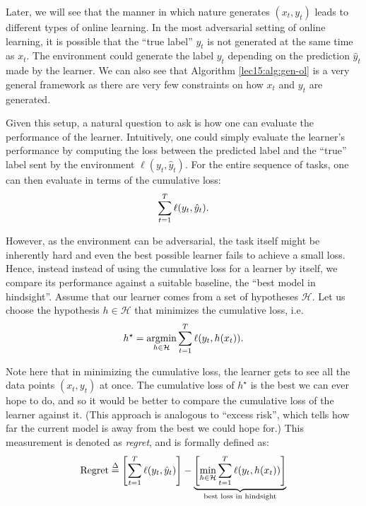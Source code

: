 Later, we will see that the manner in which nature generates  $(x_t, y_t)$ leads to different types of online learning. In the most adversarial setting of online learning, it is possible that the ``true label'' $y_t$ is not generated at the same time as $x_t$. The environment could generate the label $y_t$ depending on the prediction $\hat{y}_t$ made by the learner.  We can also see that Algorithm \ref{lec15:alg:gen-ol} is a very general framework as there are very few constraints on how $x_t$ and $y_t$ are generated.
    
Given this setup, a natural question to ask is how one can evaluate the performance of the learner. Intuitively, one could simply evaluate the learner's performance by computing the loss between the predicted label and the ``true'' label sent by the environment $\ell(y_t, \hat{y}_t)$. For the entire sequence of tasks, one can then evaluate in terms of the cumulative loss:
    \begin{align}
        \sum_{t=1}^T \ell(y_t, \hat{y}_t).
    \end{align}
    
However, as the environment can be adversarial, the task itself might be inherently hard and even the best possible learner fails to achieve a small loss. Hence, instead instead of using the cumulative loss for a learner by itself, we compare its performance against a suitable baseline, the ``best model in hindsight''. Assume that our learner comes from a set of hypotheses $\mathcal{H}$. Let us choose the hypothesis $h \in \mathcal{H}$ that minimizes the cumulative loss, i.e.
\begin{equation}
    h^\star = \operatorname*{\textup{argmin}}_{h \in \mathcal{H}} \sum_{t=1}^T \ell(y_t, h(x_t)).
\end{equation}

Note here that in minimizing the cumulative loss, the learner gets to see all the data points $(x_t, y_t)$ at once. The cumulative loss of $h^\star$ is the best we can ever hope to do, and so it would be better to compare the cumulative loss of the learner against it. (This approach is analogous to ``excess risk'', which tells how far the current model is away from the best we could hope for.) This measurement is denoted as \emph{regret}, and is formally defined as:
    \begin{align}
        \text{Regret} \overset{\Delta}{=} 
        \left[\sum_{t=1}^T \ell(y_t, \hat{y}_t)\right]
        - \underbrace{
        \left[\min_{h \in \mathcal{H}} \sum_{t=1}^T \ell(y_t, h(x_t))\right]
        }_{\text{best loss in hindsight}}
    \end{align}

